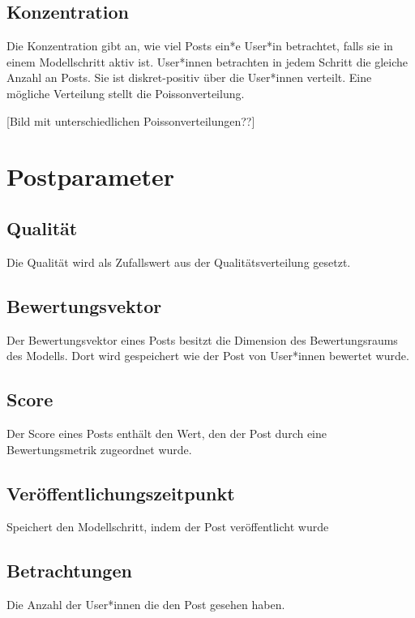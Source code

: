 \subsection{Konzentration}

Die Konzentration gibt an, wie viel Posts ein*e User*in betrachtet, falls sie in einem Modellschritt aktiv ist. User*innen betrachten in jedem Schritt die gleiche Anzahl an Posts.
Sie ist diskret-positiv über die User*innen verteilt. Eine mögliche Verteilung stellt die Poissonverteilung.

[Bild mit unterschiedlichen Poissonverteilungen??]


\section{Postparameter}

\subsection{Qualität}

Die Qualität wird als Zufallswert aus der Qualitätsverteilung gesetzt.

\subsection{Bewertungsvektor}

Der Bewertungsvektor eines Posts besitzt die Dimension des Bewertungsraums des Modells. Dort wird gespeichert wie der Post von User*innen bewertet wurde.

\subsection{Score}

Der Score eines Posts enthält den Wert, den der Post durch eine Bewertungsmetrik zugeordnet wurde.

\subsection{Veröffentlichungszeitpunkt}

Speichert den Modellschritt, indem der Post veröffentlicht wurde

\subsection{Betrachtungen}

Die Anzahl der User*innen die den Post gesehen haben.
